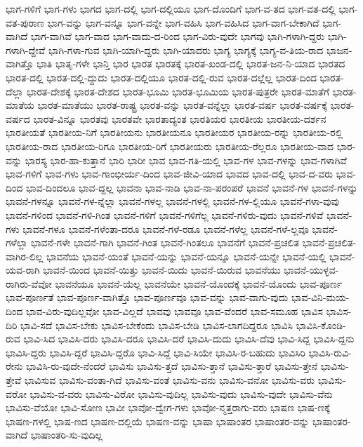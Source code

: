 {ಭಾಗ-ಗಳಿಗೆ
ಭಾಗ-ಗಳು
ಭಾಗದ
ಭಾಗ-ದಲ್ಲಿ
ಭಾಗ-ದಲ್ಲಿಯೂ
ಭಾಗ-ದೊಂದಿಗೆ
ಭಾಗ-ವ-ತದ
ಭಾಗ-ವತ-ದಲ್ಲಿ
ಭಾಗ-ವತ-ಪುರಾಣ
ಭಾಗ-ವನ್ನು
ಭಾಗ-ವನ್ನೂ
ಭಾಗ-ವನ್ನೇ
ಭಾಗ-ವಹಿಸಿ
ಭಾಗ-ವಹಿಸಿದ
ಭಾಗ-ವಾಗ-ಬೇಕಾಗಿದೆ
ಭಾಗ-ವಾಗಿದೆ
ಭಾಗ-ವಾಗಿವೆ
ಭಾಗ-ವಾದ
ಭಾಗ-ವಾದು-ದ-ರಿಂದ
ಭಾಗ-ವಿರು-ವುದೇ
ಭಾಗವು
ಭಾಗಿ-ಗಳಾಗಿ-ದ್ದರು
ಭಾಗಿ-ಗಳಾಗಿ-ದ್ದೇವೆ
ಭಾಗಿ-ಗಳಾ-ಗುವ
ಭಾಗಿ-ಯಾಗಿ-ದ್ದರು
ಭಾಗಿ-ಯಾದರು
ಭಾಗ್ಯ
ಭಾಗ್ಯಕ್ಕೆ
ಭಾಗ್ಯ-ವ-ತಿಯ-ರಾದ
ಭಾಜನ-ವಾಗಿತ್ತೊ
ಭಾತಿ
ಭಾತೃ-ಗಳೇ
ಭಾನ್ತಿ
ಭಾರ
ಭಾರತ
ಭಾರತಕ್ಕೆ
ಭಾರತ-ಖಂಡ-ದಲ್ಲಿ
ಭಾರತ-ಜನ-ನಿ-ಯಾದ
ಭಾರತದ
ಭಾರತ-ದಲ್ಲಿ
ಭಾರತ-ದಲ್ಲಿ-ದ್ದುದು
ಭಾರತ-ದಲ್ಲಿಯೂ
ಭಾರತ-ದಲ್ಲಿ-ರುವ
ಭಾರತ-ದಲ್ಲೆಲ್ಲ
ಭಾರತ-ದಿಂದ
ಭಾರತ-ದೆಲ್ಲಾ
ಭಾರತ-ದೇಶಕ್ಕೆ
ಭಾರತ-ದೇಶದ
ಭಾರತ-ಭೂಮಿ
ಭಾರತ-ಭೂಮಿಯ
ಭಾರತ-ಪುತ್ರರೇ
ಭಾರತ-ಮಾತೆಗೆ
ಭಾರತ-ಮಾತೆಯ
ಭಾರತ-ಮಾತೆಯು
ಭಾರತ-ರಾಷ್ಟ್ರ
ಭಾರತ-ವನ್ನು
ಭಾರತ-ವನ್ನೆಲ್ಲಾ
ಭಾರತ-ವರ್ಷ
ಭಾರತ-ವರ್ಷಕ್ಕೆ
ಭಾರತ-ವರ್ಷದ
ಭಾರತ-ವಿನ್ನೂ
ಭಾರತವು
ಭಾರತವೇ
ಭಾರತಾದ್ಯಂತ
ಭಾರತಿಯರ
ಭಾರತೀಯ
ಭಾರತೀಯ-ದರ್ಶನ
ಭಾರತೀಯತೆ
ಭಾರತೀಯ-ನಿಗೆ
ಭಾರತೀಯನು
ಭಾರತೀಯನೂ
ಭಾರತೀಯರ
ಭಾರತೀಯ-ರನ್ನು
ಭಾರತೀಯ-ರಲ್ಲಿ
ಭಾರತೀಯ-ರಾದ
ಭಾರತೀಯ-ರಿಗೂ
ಭಾರತೀಯ-ರಿಗೆ
ಭಾರತೀಯರು
ಭಾರತೀಯ-ರೆಲ್ಲರೂ
ಭಾರತೀಯ-ವಾದ
ಭಾರ-ವನ್ನು
ಭಾರಸ್ಯ
ಭಾರ-ಹಾ-ಕುತ್ತಾನೆ
ಭಾರಿ
ಭಾರೀ
ಭಾವ
ಭಾವ-ಗತಿ-ಯಲ್ಲಿ
ಭಾವ-ಗಳ
ಭಾವ-ಗಳನ್ನು
ಭಾವ-ಗಳಾಗಿವೆ
ಭಾವ-ಗಳಿಗೆ
ಭಾವ-ಗಳು
ಭಾವ-ಗಾಂಭೀರ್ಯ-ದಿಂದ
ಭಾವ-ಜೀವಿ-ಯಾದ
ಭಾವದ
ಭಾವ-ದಲ್ಲಿ
ಭಾವ-ದ-ವರು
ಭಾವ-ದಿಂದ
ಭಾವ-ದಿಂದಲೂ
ಭಾವ-ದ್ದಲ್ಲ
ಭಾವನಾ
ಭಾವ-ನಾಡಿ
ಭಾವ-ನಾ-ಪರಂಪರೆ
ಭಾವನೆ
ಭಾವನೆ-ಗಳ
ಭಾವನೆ-ಗಳನ್ನು
ಭಾವನೆ-ಗಳನ್ನೂ
ಭಾವನೆ-ಗಳ-ನ್ನೆಲ್ಲಾ
ಭಾವನೆ-ಗಳಲ್ಲ
ಭಾವನೆ-ಗಳಲ್ಲಿ
ಭಾವನೆ-ಗಳ-ಲ್ಲಿಯೂ
ಭಾವನೆ-ಗಳಾ-ವುವು
ಭಾವನೆ-ಗಳಿಂದ
ಭಾವನೆ-ಗಳಿ-ಗಿಂತ
ಭಾವನೆ-ಗಳಿಗೆ
ಭಾವನೆ-ಗಳಿಗೆಲ್ಲ
ಭಾವನೆ-ಗಳಿರು-ವುದು
ಭಾವನೆ-ಗಳಿವೆ
ಭಾವನೆ-ಗಳು
ಭಾವನೆ-ಗಳೂ
ಭಾವನೆ-ಗಳೆಂತಾ-ದರೂ
ಭಾವನೆ-ಗಳೆ-ರಡೂ
ಭಾವನೆ-ಗಳೆಲ್ಲ
ಭಾವನೆ-ಗಳೆ-ಲ್ಲವೂ
ಭಾವನೆ-ಗಳೆಲ್ಲಾ
ಭಾವನೆ-ಗಳೇ
ಭಾವನೆ-ಗಾಗಿ
ಭಾವನೆ-ಗಿಂತ
ಭಾವನೆ-ಗಿಂತಲೂ
ಭಾವನೆಗೆ
ಭಾವನೆ-ಪ್ರಚಲಿತ
ಭಾವನೆ-ಪ್ರಚಲಿತ-ವಾಗಿರ-ಲಿಲ್ಲ
ಭಾವನೆಯ
ಭಾವನೆ-ಯಂತೆ
ಭಾವನೆ-ಯನ್ನು
ಭಾವನೆ-ಯನ್ನೂ
ಭಾವನೆ-ಯನ್ನೇ
ಭಾವನೆ-ಯಲ್ಲಿ
ಭಾವನೆ-ಯವ-ರಾಗಿ
ಭಾವನೆ-ಯಿಂದ
ಭಾವನೆ-ಯಿತ್ತು
ಭಾವನೆ-ಯಿದು
ಭಾವನೆ-ಯಿರುವ
ಭಾವನೆಯು
ಭಾವನೆ-ಯುಳ್ಳವ-ರಾಗಿರು-ವೆವೋ
ಭಾವನೆಯೂ
ಭಾವನೆ-ಯೆಲ್ಲ
ಭಾವನೆಯೇ
ಭಾವನೆ-ಯೊಂದಕ್ಕೆ
ಭಾವನೆ-ಯೊಂದು
ಭಾವ-ಪೂರ್ಣ
ಭಾವ-ಪೂರ್ಣತೆ
ಭಾವ-ಪೂರ್ಣ-ವಾಗಿತ್ತೊ
ಭಾವ-ಪೂರ್ಣವೂ
ಭಾವ-ವನ್ನು
ಭಾವ-ವಾಗು-ವುದು
ಭಾವ-ವಿನಿ-ಮಯ-ದಿಂದ
ಭಾವ-ವಿರು-ವುದಿಲ್ಲವೋ
ಭಾವ-ವಿಲ್ಲದೆ
ಭಾವವು
ಭಾವವೂ
ಭಾವ-ವೆಂದರೆ
ಭಾವ-ಸಮೂಹ
ಭಾವಿಸ
ಭಾವಿಸ-ದಿರಿ
ಭಾವಿ-ಸದೆ
ಭಾವಿಸ-ಬೇಕು
ಭಾವಿಸ-ಬೇಕೆಂದು
ಭಾವಿಸ-ಬೇಡಿ
ಭಾವಿಸ-ಲಾಗದಿದ್ದರೂ
ಭಾವಿಸಿ
ಭಾವಿಸಿ-ಕೊಂಡಿ-ರುವ
ಭಾವಿ-ಸಿದ
ಭಾವಿಸಿ-ದರು
ಭಾವಿಸಿ-ದರೂ
ಭಾವಿಸಿ-ದರೆ
ಭಾವಿಸಿ-ದುದು
ಭಾವಿಸಿ-ದೆವು
ಭಾವಿ-ಸಿದ್ದ
ಭಾವಿಸಿ-ದ್ದನು
ಭಾವಿಸಿ-ದ್ದರು
ಭಾವಿಸಿ-ದ್ದರೆ
ಭಾವಿಸಿ-ದ್ದರೊ
ಭಾವಿ-ಸಿದ್ದೆ
ಭಾವಿ-ಸಿಯೇ
ಭಾವಿಸಿ-ರ-ಬಹುದು
ಭಾವಿಸಿರಿ
ಭಾವಿಸಿ-ರುವಿ-ರೇನು
ಭಾವಿಸಿ-ರು-ವುದೇ-ನೆಂದರೆ
ಭಾವಿಸು
ಭಾವಿಸು-ತ್ತದೆ
ಭಾವಿಸು-ತ್ತಾನೆ
ಭಾವಿಸು-ತ್ತಾರೆ
ಭಾವಿಸು-ತ್ತೇನೆ
ಭಾವಿಸು-ತ್ತೇವೆ
ಭಾವಿಸುವ
ಭಾವಿಸು-ವಂತಾ-ಗಿದೆ
ಭಾವಿಸು-ವಂತೆ
ಭಾವಿಸು-ವನು
ಭಾವಿಸು-ವನೋ
ಭಾವಿಸು-ವರು
ಭಾವಿಸು-ವರೋ
ಭಾವಿಸು-ವ-ವರು
ಭಾವಿಸು-ವಿರೋ
ಭಾವಿಸು-ವುದಿಲ್ಲ
ಭಾವಿಸು-ವುದು
ಭಾವಿಸು-ವುದೇ
ಭಾವಿಸು-ವೆನು
ಭಾವಿಸು-ವೆಯೋ
ಭಾವಿ-ಸೋಣ
ಭಾವೀ
ಭಾವೋ-ದ್ವೇಗ-ಗಳು
ಭಾವೋ-ನ್ಮತ್ತರಾಗು-ವರು
ಭಾಷಣ
ಭಾಷ-ಣಕ್ಕೆ
ಭಾಷಣ-ಗಳಲ್ಲಿ
ಭಾಷ-ಣದ
ಭಾಷಣ-ದಲ್ಲಿಯೆ
ಭಾಷಣ-ವನ್ನು
ಭಾಷಾ
ಭಾಷಾಂತರ
ಭಾಷಾಂತರ-ವನ್ನು
ಭಾಷಾಂತರ-ವಾಗಿದೆ
ಭಾಷಾಂತರಿ-ಸು-ವುದಿಲ್ಲ
}
